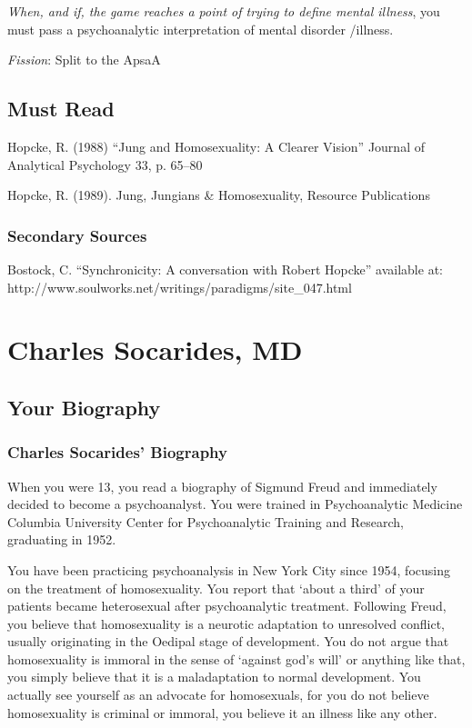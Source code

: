 \emph{When, and if, the game reaches a point of trying to define mental illness}, you must pass a psychoanalytic interpretation of mental disorder \slash  illness.

\emph{Fission}: Split to the ApsaA

\section{Must Read}
\label{mustread}

Hopcke, R. (1988) ``Jung and Homosexuality: A Clearer Vision'' Journal of Analytical Psychology 33, p. 65--80

Hopcke, R. (1989). Jung, Jungians \& Homosexuality, Resource Publications

\subsection{Secondary Sources}
\label{secondarysources}

Bostock, C. ``Synchronicity: A conversation with Robert Hopcke'' available at: http:\slash \slash www.soulworks.net\slash writings\slash paradigms\slash site\_047.html

\chapter{Charles Socarides, MD}
\label{charlessocaridesmd}

\section{Your Biography}
\label{yourbiography}

\subsection{Charles Socarides' Biography}
\label{charlessocaridesbiography}

When you were 13, you read a biography of Sigmund Freud and immediately decided to become a psychoanalyst. You were trained in Psychoanalytic Medicine Columbia University Center for Psychoanalytic Training and Research, graduating in 1952.

You have been practicing psychoanalysis in New York City since 1954, focusing on the treatment of homosexuality. You report that `about a third' of your patients became heterosexual after psychoanalytic treatment. Following Freud, you believe that homosexuality is a neurotic adaptation to unresolved conflict, usually originating in the Oedipal stage of development. You do not argue that homosexuality is immoral in the sense of `against god's will' or anything like that, you simply believe that it is a maladaptation to normal development. You actually see yourself as an advocate for homosexuals, for you do not believe homosexuality is criminal or immoral, you believe it an illness like any other.

